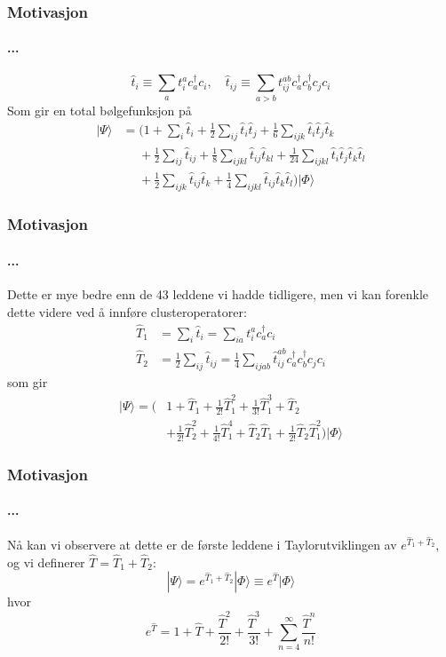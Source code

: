 \documentclass[norsk,a4paper,12pt]{beamer}
\begin{document}
  \begin{frame}
    \frametitle{Motivasjon}
    \framesubtitle{...}
    \begin{equation}
    \hat{t}_i\equiv \sum_a t_i^a c_a^{\dagger}c_i,\quad \hat{t}_{ij}\equiv\sum_{a>b}t_{ij}^{ab}c_a^{\dagger}c_b^{\dagger}c_jc_i
    \end{equation}
    Som gir en total bølgefunksjon på 
    \begin{align*}
    |\Psi\rangle&=\bigg(1+\sum_i\hat{t}_i+\frac{1}{2}\sum_{ij}\hat{t}_i\hat{t}_j+\frac{1}{6}\sum_{ijk}\hat{t}_i\hat{t}_j\hat{t}_k\\
    &\mathrel{\phantom{=}}+\frac{1}{2}\sum_{ij}\hat{t}_{ij}
    +\frac{1}{8}\sum_{ijkl}\hat{t}_{ij}\hat{t}_{kl}+\frac{1}{24}\sum_{ijkl}\hat{t}_i\hat{t}_j\hat{t}_k\hat{t}_l\\
    &\mathrel{\phantom{=}}+\frac{1}{2}\sum_{ijk}\hat{t}_{ij}\hat{t}_k+\frac{1}{4}\sum_{ijkl}\hat{t}_{ij}\hat{t}_k\hat{t}_l\bigg)|\Phi\rangle
    \end{align*}
    
  \end{frame}
  \begin{frame}
    \frametitle{Motivasjon}
    \framesubtitle{...}
    Dette er mye bedre enn de 43 leddene vi hadde tidligere, men vi kan forenkle dette videre ved å innføre clusteroperatorer:
    \begin{align*}
    \hat{T}_1&=\sum_i\hat{t}_i=\sum_{ia}t_i^ac_a^{\dagger}c_i\\
    \hat{T}_2&=\frac{1}{2}\sum_{ij}\hat{t}_{ij}=\frac{1}{4}\sum_{ijab}\hat{t}_{ij}^{ab}c_a^{\dagger}c_b^{\dagger}c_jc_i
    \end{align*}
    som gir
    \begin{align*}
    |\Psi\rangle=\bigg(&1+\hat{T}_1+\frac{1}{2!}\hat{T}_1^2+\frac{1}{3!}\hat{T}_1^3+\hat{T}_2\\
    &+\frac{1}{2!}\hat{T}_2^2+\frac{1}{4!}\hat{T}_1^4+\hat{T}_2\hat{T}_1+\frac{1}{2!}\hat{T}_2\hat{T}_1^2\bigg)|\Phi\rangle
    \end{align*}
  \end{frame}
  \begin{frame}
    \frametitle{Motivasjon}
    \framesubtitle{...}
    Nå kan vi observere at dette er de første leddene i Taylorutviklingen av $e^{\hat{T}_1+\hat{T}_2}$, og vi definerer $\hat{T}=\hat{T}_1+\hat{T}_2$:
    \begin{equation}
    |\Psi\rangle=e^{\hat{T}_1+\hat{T}_2}|\Phi\rangle\equiv e^{\hat{T}}|\Phi\rangle
    \end{equation}
    hvor
    \begin{equation}
    e^{\hat{T}}=1+\hat{T}+\frac{\hat{T}^2}{2!}+\frac{\hat{T}^3}{3!}+\sum_{n=4}^{\infty}\frac{\hat{T}^n}{n!}
    \end{equation}
  \end{frame}
\end{document}
